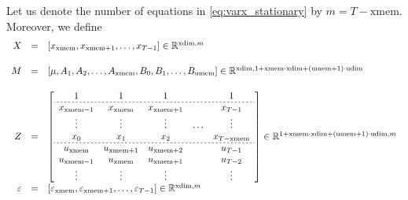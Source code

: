 \documentclass{article}
\begin{document}
 Let us denote the number of equations in \eqref{eq:varx_stationary} by $m = T-\mathrm{xmem}$.
 Moreover, we define 
 \begin{displaymath}
  \begin{array}{rcl}
   X & = & [x_{\mathrm{xmem}}, x_{\mathrm{xmem}+1}, \dots, x_{T-1}] \in \mathbb{R}^{\mathrm{xdim},m} \\[5mm]
   M & = & [\mu, A_1, A_2, \dots, A_{\mathrm{xmem}}, B_0, B_1, \dots, B_{\mathrm{umem}} ] \in \mathbb{R}^{\mathrm{xdim},1+\mathrm{xmem}\cdot\mathrm{xdim}+(\mathrm{umem}+1)\cdot\mathrm{udim}}\\[5mm]
   Z & = & \left[
	\begin{array}{ccccc}
	 1 & 1 & 1 & & 1 \\ \hdashline[2pt/2pt]
	 x_{\mathrm{xmem}-1} & x_{\mathrm{xmem}} & x_{\mathrm{xmem}+1} & & x_{T-1} \\
	 \vdots & \vdots & \vdots & \dots & \vdots \\
	 x_0 & x_1 & x_2 & & x_{T-\mathrm{xmem}} \\ \hdashline[2pt/2pt]
	 u_{\mathrm{xmem}} & u_{\mathrm{xmem}+1} & u_{\mathrm{xmem}+2} & & u_{T-1} \\
	 u_{\mathrm{xmem}-1} & u_{\mathrm{xmem}} & u_{\mathrm{xmem}+1} & & u_{T-2} \\
	 \vdots & \vdots & \vdots & & \vdots 
    \end{array}
   \right] \in \mathbb{R}^{1+\mathrm{xmem}\cdot\mathrm{xdim}+(\mathrm{umem}+1)\cdot\mathrm{udim},m} \\[5mm]
   \varepsilon & = & [\varepsilon_{\mathrm{xmem}}, \varepsilon_{\mathrm{xmem}+1}, \dots, \varepsilon_{T-1}] \in \mathbb{R}^{\mathrm{xdim},m}
  \end{array}
 \end{displaymath}
\end{document}
